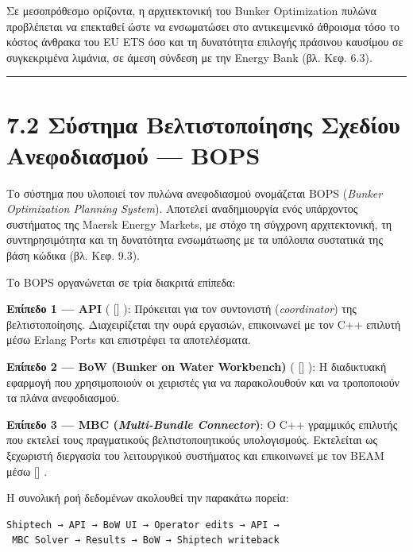 \documentclass[11pt,a4paper,greek,twoside]{template-xe}
\let\origtexttt\texttt
\renewcommand{\texttt}[1]{%
  \begingroup
  \StrSubstitute{#1}{.}{.\allowbreak}[\tttmp]%
  \origtexttt{\tttmp}%
  \endgroup
}
\begin{document}
Σε μεσοπρόθεσμο ορίζοντα, η αρχιτεκτονική του Bunker Optimization πυλώνα
προβλέπεται να επεκταθεί ώστε να ενσωματώσει στο αντικειμενικό άθροισμα
τόσο το κόστος άνθρακα του EU ETS όσο και τη δυνατότητα επιλογής
πράσινου καυσίμου σε συγκεκριμένα λιμάνια, σε άμεση σύνδεση με την
Energy Bank (βλ. Κεφ. 6.3).

\begin{center}\rule{0.5\linewidth}{0.5pt}\end{center}

\section{7.2 Σύστημα Βελτιστοποίησης Σχεδίου Ανεφοδιασμού ---
BOPS}\label{ux3c3ux3cdux3c3ux3c4ux3b7ux3bcux3b1-ux3b2ux3b5ux3bbux3c4ux3b9ux3c3ux3c4ux3bfux3c0ux3bfux3afux3b7ux3c3ux3b7ux3c2-ux3c3ux3c7ux3b5ux3b4ux3afux3bfux3c5-ux3b1ux3bdux3b5ux3c6ux3bfux3b4ux3b9ux3b1ux3c3ux3bcux3bfux3cd-bops}

Το σύστημα που υλοποιεί τον πυλώνα ανεφοδιασμού ονομάζεται BOPS
(\emph{Bunker Optimization Planning System}). Αποτελεί αναδημιουργία
ενός υπάρχοντος συστήματος της Maersk Energy Markets, με στόχο τη
σύγχρονη αρχιτεκτονική, τη συντηρησιμότητα και τη δυνατότητα ενσωμάτωσης
με τα υπόλοιπα συστατικά της βάση κώδικα (βλ. Κεφ. 9.3).

Το BOPS οργανώνεται σε τρία διακριτά επίπεδα:

\textbf{Επίπεδο 1 --- API} (\texttt{bunker/api/}): Πρόκειται για τον
συντονιστή (\emph{coordinator}) της βελτιστοποίησης. Διαχειρίζεται την
ουρά εργασιών, επικοινωνεί με τον C++ επιλυτή μέσω Erlang Ports και
επιστρέφει τα αποτελέσματα.

\textbf{Επίπεδο 2 --- BoW (Bunker on Water Workbench)}
(\texttt{bunker/bow/}): Η διαδικτυακή εφαρμογή που χρησιμοποιούν οι
χειριστές για να παρακολουθούν και να τροποποιούν τα πλάνα ανεφοδιασμού.

\textbf{Επίπεδο 3 --- MBC (\emph{Multi-Bundle Connector})}: Ο C++
γραμμικός επιλυτής που εκτελεί τους πραγματικούς βελτιστοποιητικούς
υπολογισμούς. Εκτελείται ως ξεχωριστή διεργασία του λειτουργικού
συστήματος και επικοινωνεί με τον BEAM μέσω \texttt{Port}.

Η συνολική ροή δεδομένων ακολουθεί την παρακάτω πορεία:

\begin{verbatim}
Shiptech → API → BoW UI → Operator edits → API →
 MBC Solver → Results → BoW → Shiptech writeback
\end{verbatim}
\end{document}
